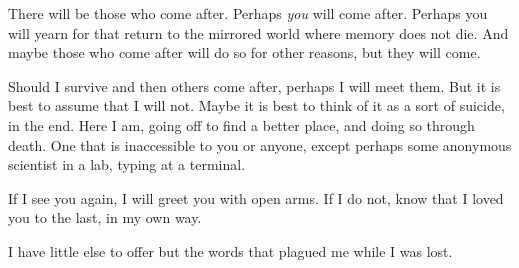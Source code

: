 There will be those who come after. Perhaps \emph{you} will come after. Perhaps you will yearn for that return to the mirrored world where memory does not die. And maybe those who come after will do so for other reasons, but they will come.

Should I survive and then others come after, perhaps I will meet them. But it is best to assume that I will not. Maybe it is best to think of it as a sort of suicide, in the end. Here I am, going off to find a better place, and doing so through death. One that is inaccessible to you or anyone, except perhaps some anonymous scientist in a lab, typing at a terminal.

If I see you again, I will greet you with open arms. If I do not, know that I loved you to the last, in my own way.

I have little else to offer but the words that plagued me while I was lost.


